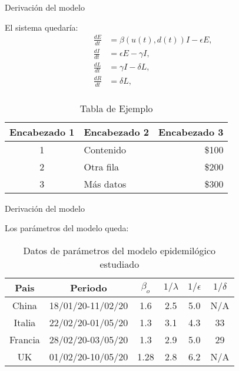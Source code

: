 \documentclass{beamer}
\begin{document}
\begin{frame}{Derivación del modelo}
\begin{justify}
\vspace{0.3cm}
\item El sistema quedaría:
\begin{align}
    \frac{dE}{dt} &= \beta(u(t), d(t))I - \epsilon E, \label{eq:Et} \\[10pt]
    \frac{dI}{dt} &= \epsilon E - \gamma I, \label{eq:It} \\[10pt]
    \frac{dL}{dt} &= \gamma I - \delta L, \label{eq:Lt} \\[10pt]
    \frac{dR}{dt} &= \delta L, \label{eq:Tt} \\[10pt]
\end{align}
\begin{table}[htbp]
  \centering
  \caption{Tabla de Ejemplo}
  \begin{tabular}{|c|l|r|}
    \hline
    \textbf{Encabezado 1} & \textbf{Encabezado 2} & \textbf{Encabezado 3} \\
    \hline
    1 & Contenido & \$100 \\
    2 & Otra fila & \$200 \\
    3 & Más datos & \$300 \\
    \hline
  \end{tabular}
\end{table}

\end{justify}
\end{frame}

\begin{frame}{Derivación del modelo}
\begin{justify}
\vspace{0.3cm}
\item Los parámetros del modelo queda:
\begin{table}
    \centering
    \caption{Datos de parámetros del modelo epidemilógico estudiado}
    \begin{tabular}{|c|c|c|c|c|c|}
        \hline
        \textbf{Pais} & \textbf{Periodo} & \textbf{$\beta_o$} &
        \textbf{$1/\lambda$} &
        \textbf{$1/\epsilon$} &
        \textbf{$1/\delta$}  \\
        \hline
        China & 18/01/20-11/02/20 & 1.6 & 2.5 & 5.0 & N/A \\
        \hline
        Italia & 22/02/20-01/05/20 & 1.3 & 3.1 & 4.3 & 33 \\
        \hline
        Francia & 28/02/20-03/05/20 & 1.3 & 2.9 & 5.0 & 29 \\
        \hline
        UK & 01/02/20-10/05/20 & 1.28 & 2.8 & 6.2 & N/A \\
        \hline
    \end{tabular}
\end{table}
\end{justify}
\end{frame}
\end{document}
